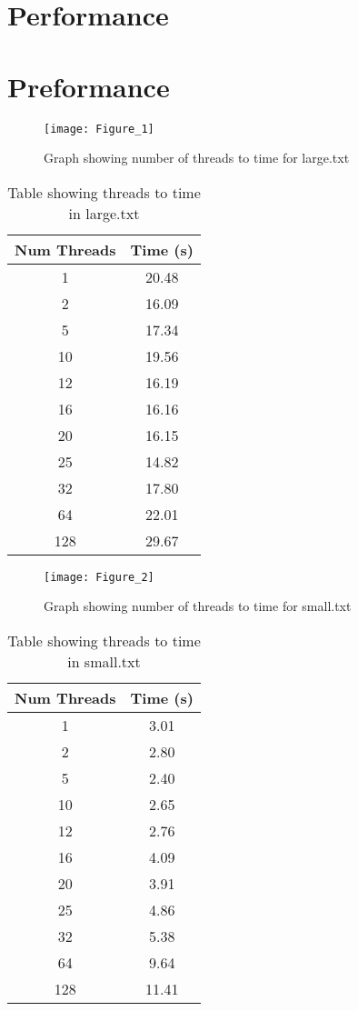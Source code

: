 \documentclass[12pt]{article}
\begin{document}
\section{Performance}


\section{Preformance}

\begin{figure}[H]
\texttt{[image: Figure\_1]}
\caption{Graph showing number of threads to time for large.txt}
\end{figure}

\begin{table}[H]
\caption{Table showing threads to time in large.txt}
\begin{center}
\begin{tabular}{||c | c||}
 \hline
 Num Threads & Time (s) \\
 \hline
 1 & 20.48\\
 2 & 16.09\\
 5 & 17.34\\
 10 & 19.56\\
 12 & 16.19\\
 16 & 16.16\\
 20 & 16.15\\
 25 & 14.82\\
 32 & 17.80\\
 64 & 22.01\\
 128 & 29.67\\
 \hline
\end{tabular}
\end{center}
\end{table}

\begin{figure}[H]
\texttt{[image: Figure\_2]}
\caption{Graph showing number of threads to time for small.txt}
\end{figure}

\begin{table}[H]
\caption{Table showing threads to time in small.txt}
\begin{center}
\begin{tabular}{||c | c||}
 \hline
 Num Threads & Time (s) \\
 \hline
 1 & 3.01\\
 2 & 2.80\\
 5 & 2.40\\
 10 & 2.65\\
 12 & 2.76\\
 16 & 4.09\\
 20 & 3.91\\
 25 & 4.86\\
 32 & 5.38\\
 64 & 9.64\\
 128 & 11.41\\
 \hline
\end{tabular}
\end{center}
\end{table}
\end{document}
